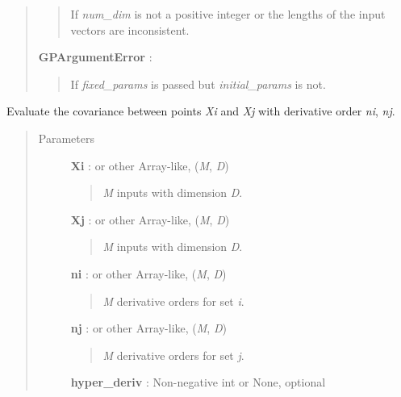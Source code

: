 \documentclass[letterpaper,10pt,english]{sphinxmanual}
\begin{document}
\begin{fulllineitems}
\begin{quote}
\begin{description}
\begin{quote}
If \emph{num\_dim} is not a positive integer or the lengths of
the input vectors are inconsistent.
\end{quote}

\textbf{GPArgumentError} :
\begin{quote}

If \emph{fixed\_params} is passed but \emph{initial\_params} is not.
\end{quote}

\end{description}\end{quote}

\begin{fulllineitems}
\label{gptools.kernel:gptools.kernel.squared_exponential.SquaredExponentialKernel.__call__}
Evaluate the covariance between points \emph{Xi} and \emph{Xj} with derivative order \emph{ni}, \emph{nj}.
\begin{quote}\begin{description}
\item[{Parameters}] \leavevmode
\textbf{Xi} :  or other Array-like, (\emph{M}, \emph{D})
\begin{quote}

\emph{M} inputs with dimension \emph{D}.
\end{quote}

\textbf{Xj} :  or other Array-like, (\emph{M}, \emph{D})
\begin{quote}

\emph{M} inputs with dimension \emph{D}.
\end{quote}

\textbf{ni} :  or other Array-like, (\emph{M}, \emph{D})
\begin{quote}

\emph{M} derivative orders for set \emph{i}.
\end{quote}

\textbf{nj} :  or other Array-like, (\emph{M}, \emph{D})
\begin{quote}

\emph{M} derivative orders for set \emph{j}.
\end{quote}

\textbf{hyper\_deriv} : Non-negative int or None, optional
\begin{quote}


\end{quote}
\end{description}
\end{quote}
\end{fulllineitems}
\end{fulllineitems}
\end{document}
